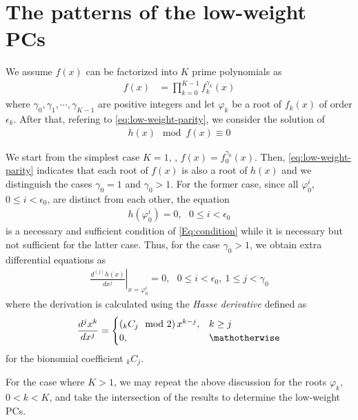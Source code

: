 \section{The patterns of the low-weight PCs}
\label{sec3}
We assume $f(x)$ can be factorized into $K$ prime polynomials as 
\begin{align}
f(x)&=\prod_{k=0}^{K-1}f_k^{\gamma_k}(x)
\end{align}
where $\gamma_0,\gamma_1,\cdots,\gamma_{K-1}$ are positive integers and let $\varphi_k$ be a root of $f_{k}(x)$ of order $\epsilon_k$. After that, refering to \eqref{eq:low-weight-parity}, we consider the solution of
\begin{align}
	h(x) \mod f(x) \equiv 0
	\label{Eq:condition}
\end{align}

We start from the simplest case $K=1$, \ie, $f(x) = f_0^{\gamma_0}(x)$. Then, \eqref{eq:low-weight-parity} indicates that each root of $f(x)$ is also a root of $h(x)$ and we distinguish the cases $\gamma_0 = 1$ and $\gamma_0 > 1$. For the former case, since all $\varphi_0^i$, $0 \leq i < \epsilon_0$, are distinct from each other, the equation
\begin{align}
	h(\varphi_0^i)=0,~~~ 0 \leq i < \epsilon_0
	\label{Eq:rootcondition}
\end{align}
is a necessary and sufficient condition of \eqref{Eq:condition} while it is necessary but not sufficient for the latter case. Thus, for the case $\gamma_0 >1$, we obtain extra differential equations as
\begin{align}
\left.\frac{d^{(j)}h(x)}{d x^j}\right|_{x=\varphi_0^i}=0,~~~0 \leq i < \epsilon_0,~1 \leq j < \gamma_0
\label{Eq:differential}
\end{align}
where the derivation is calculated using the {\it Hasse derivative} defined as
\begin{align}
\frac{d^{j}x^k}{dx^j}=
	\begin{cases}
	\left({}_kC_j\mod 2\right)x^{k-j}, & k \geq j\cr
	0, & \mathotherwise
	\end{cases}
\end{align}
for the bionomial coefficient ${}_kC_j$.

For the case where $K>1$, we may repeat the above discussion for the roots $\varphi_k$, $0 < k < K$, and take the intersection of the results to determine the low-weight PCs.

